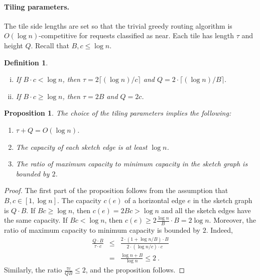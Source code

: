 \documentclass[11pt]{article}
\newtheorem{proposition}[theorem]{Proposition}
\newtheorem{defn}[theorem]{Definition}
\newenvironment{proof sketch}[1]{\noindent {\emph{Proof sketch of #1:}}}{\hfill \qed}
\newcommand{\hl}{\tau}
\newcommand{\vl}{Q}
\begin{document}
\paragraph{Tiling parameters.}
The tile side lengths are set so that the trivial greedy routing algorithm is $O(\log
n)$-competitive for requests classified as near. Each tile has length $\hl$ and
height $\vl$.
Recall that $B,c\leq \log n$.
\begin{defn}\label{def:xy}
    \begin{enumerate}[(i)]
    \item
    If $B\cdot c < \log n$, then
    $\hl=2\lceil (\log n)/c \rceil$ and $\vl=2\cdot \lceil (\log n)/B\rceil$.
    \item
    If $B\cdot c \geq \log n$, then
     $\hl=2B$ and $\vl=2c$.
\end{enumerate}
\end{defn}

\begin{proposition}\label{prop:tiling}
The choice of the tiling parameters implies the following:
  \begin{enumerate}
\item $\hl+\vl = O(\log n)$.
  \item The capacity of each sketch edge is at least $\log n$.
  \item The ratio of maximum capacity to minimum capacity in the sketch graph is bounded by $2$.
 \end{enumerate}
\end{proposition}

\begin{proof}
  The first part of the proposition follows from the assumption that $B,c\in[1,\log
  n]$.  The capacity $c(e)$ of a horizontal edge $e$ in the sketch graph is $\vl\cdot
  B$.
If $Bc\geq \log n$, then $c(e)= 2Bc > \log n$ and all the sketch edges have the same capacity.
If $Bc< \log n$, then $c(e)\geq 2\frac{\log n}{B} \cdot B = 2\log n$.
Moreover, the ratio of maximum capacity to minimum capacity is bounded
by $2$. Indeed,
      \begin{eqnarray*}
        \frac {\vl \cdot B}{\hl \cdot c} & \leq & \frac {2 \cdot (1+\log n /B)\cdot B} {2\cdot (\log n/c) \cdot c}\\
        & = & \frac {\log n + B}{\log n} \leq 2\:.
    \end{eqnarray*}
Similarly, the ratio $\frac {\hl c}{\vl B} \leq 2$, and the proposition follows.
\end{proof}
\end{document}
